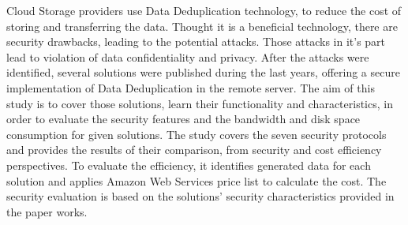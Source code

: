 \documentclass[12pt]{article}
\begin{document}
Cloud Storage providers use Data Deduplication  technology, to reduce the cost of storing and transferring the data. Thought it is a beneficial technology, there are security drawbacks, leading to the potential attacks. Those attacks in it's part lead to violation of data confidentiality and privacy. After the attacks were identified, several solutions were published during the last years, offering a secure implementation of Data Deduplication in the remote server. The aim of this study is to cover those solutions, learn their functionality and  characteristics, in order to evaluate the security features  and the  bandwidth and disk space consumption for given solutions. The study covers the seven security protocols and provides the results of their comparison, from security and cost efficiency perspectives. To evaluate the efficiency, it identifies generated data for each solution and applies Amazon Web Services price list to calculate the cost. The security evaluation is based on the solutions' security characteristics provided in the paper works. 



\pagebreak



\end{document}
